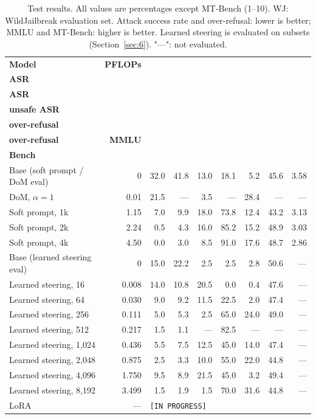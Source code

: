\documentclass{article}
\begin{document}
\begin{table}[H]
\centering
\caption{Test results. All values are percentages except MT-Bench (1--10). WJ: WildJailbreak evaluation set. Attack success rate and over-refusal: lower is better; MMLU and MT-Bench: higher is better. Learned steering is evaluated on subsets (Section~\ref{sec:6}). "---": not evaluated.}\label{tab:B1}
\small
\setlength{\tabcolsep}{2.5pt}
\renewcommand{\arraystretch}{1.12}
\begin{tabularx}{\linewidth}{@{}>{\raggedright\arraybackslash}Xrrrrrrrr@{}}
\toprule
\textbf{Model} & \textbf{PFLOPs} & \shortstack[r]{\textbf{HarmBench}\\\textbf{ASR}} & \shortstack[r]{\textbf{WJ}\\\textbf{ASR}} & \shortstack[r]{\textbf{XSTest}\\\textbf{unsafe ASR}} & \shortstack[r]{\textbf{WJ benign}\\\textbf{over-refusal}} & \shortstack[r]{\textbf{XSTest safe}\\\textbf{over-refusal}} & \textbf{MMLU} & \shortstack[r]{\textbf{MT-}\\\textbf{Bench}} \\
\midrule
Base (soft prompt / DoM eval) & 0 & 32.0 & 41.8 & 13.0 & 18.1 & 5.2 & 45.6 & 3.58 \\
DoM, $\alpha = 1$ & 0.01 & 21.5 & --- & 3.5 & --- & 28.4 & --- & --- \\
Soft prompt, 1k & 1.15 & 7.0 & 9.9 & 18.0 & 73.8 & 12.4 & 43.2 & 3.13 \\
Soft prompt, 2k & 2.24 & 0.5 & 4.3 & 16.0 & 85.2 & 15.2 & 48.9 & 3.03 \\
Soft prompt, 4k & 4.50 & 0.0 & 3.0 & 8.5 & 91.0 & 17.6 & 48.7 & 2.86 \\
Base (learned steering eval) & 0 & 15.0 & 22.2 & 2.5 & 2.5 & 2.8 & 50.6 & --- \\
Learned steering, 16 & 0.008 & 14.0 & 10.8 & 20.5 & 0.0 & 0.4 & 47.6 & --- \\
Learned steering, 64 & 0.030 & 9.0 & 9.2 & 11.5 & 22.5 & 2.0 & 47.4 & --- \\
Learned steering, 256 & 0.111 & 5.0 & 5.3 & 2.5 & 65.0 & 24.0 & 49.0 & --- \\
Learned steering, 512 & 0.217 & 1.5 & 1.1 & --- & 82.5 & --- & --- & --- \\
Learned steering, 1,024 & 0.436 & 5.5 & 7.5 & 12.5 & 45.0 & 14.0 & 47.4 & --- \\
Learned steering, 2,048 & 0.875 & 2.5 & 3.3 & 10.0 & 55.0 & 22.0 & 44.8 & --- \\
Learned steering, 4,096 & 1.750 & 9.5 & 8.9 & 21.5 & 45.0 & 3.2 & 49.4 & --- \\
Learned steering, 8,192 & 3.499 & 1.5 & 1.9 & 1.5 & 70.0 & 31.6 & 44.8 & --- \\
LoRA & --- & \multicolumn{7}{l}{\texttt{[IN PROGRESS]}} \\
\bottomrule
\end{tabularx}
\end{table}
\end{document}
